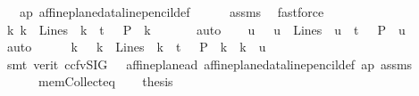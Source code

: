 \begin{isabellebody}
\ {}\ {}\ ap\ affine{\isacharunderscore}{\kern0pt}plane{\isacharunderscore}{\kern0pt}data{\isachardot}{\kern0pt}line{\isacharunderscore}{\kern0pt}pencil{\isacharunderscore}{\kern0pt}def\isanewline
\ \ \ \ \isamarkupfalse%
\ assms{\isacharparenleft}{\kern0pt}{}{\isacharparenright}{\kern0pt}\ \isamarkupfalse%
\ fastforce\isanewline
\ \ \isamarkupfalse%
\ {}{\isacharcolon}{\kern0pt}{\isachardoublequoteopen}{\isasymexists}k{\isachardot}{\kern0pt}\ k\ {\isasymin}\ Lines\ {\isasymand}\ k\ {\isasymin}\ t\ {\isasymand}\ \ P\ {\isasymlhd}\ k{\isachardoublequoteclose}\ \isamarkupfalse%
\ {}\ {}\ {}\ \isamarkupfalse%
\ auto\isanewline
\ \ \isamarkupfalse%
\ u\ \ {}{\isacharcolon}{\kern0pt}\ {\isachardoublequoteopen}u\ {\isasymin}\ Lines\ {\isasymand}\ u\ {\isasymin}\ t\ {\isasymand}\ \ P\ {\isasymlhd}\ u{\isachardoublequoteclose}\ \isamarkupfalse%
\ {}\ {}\ \isamarkupfalse%
\ auto\isanewline
\ \ \isamarkupfalse%
\ {}{\isacharcolon}{\kern0pt}\ {\isachardoublequoteopen}{\isasymforall}\ k\ {\isachardot}{\kern0pt}\ {\isacharparenleft}{\kern0pt}{\isacharparenleft}{\kern0pt}\ k\ {\isasymin}\ Lines\ {\isasymand}\ k\ {\isasymin}\ t\ {\isasymand}\ \ P\ {\isasymlhd}\ k{\isacharparenright}{\kern0pt}\ {\isasymlongrightarrow}\ k\ {\isacharequal}{\kern0pt}\ u{\isacharparenright}{\kern0pt}{\isachardoublequoteclose}\ \isanewline
\ \ \isamarkupfalse%
\ {\isacharparenleft}{\kern0pt}smt\ {\isacharparenleft}{\kern0pt}verit{\isacharcomma}{\kern0pt}\ ccfv{\isacharunderscore}{\kern0pt}SIG{\isacharparenright}{\kern0pt}\ {\isachardoublequoteopen}{}{\isachardoublequoteclose}\ {\isachardoublequoteopen}{}{\isachardoublequoteclose}\ affine{\isacharunderscore}{\kern0pt}plane{\isachardot}{\kern0pt}a{}d\ affine{\isacharunderscore}{\kern0pt}plane{\isacharunderscore}{\kern0pt}data{\isachardot}{\kern0pt}line{\isacharunderscore}{\kern0pt}pencil{\isacharunderscore}{\kern0pt}def\ ap\ assms{\isacharparenleft}{\kern0pt}{}{\isacharcomma}{\kern0pt}{}{\isacharparenright}{\kern0pt}\isanewline
\ \ \ \ \ \ mem{\isacharunderscore}{\kern0pt}Collect{\isacharunderscore}{\kern0pt}eq{\isacharparenright}{\kern0pt}\isanewline
\isanewline
\ \ \isamarkupfalse%
\ {\isacharquery}{\kern0pt}thesis\ \isamarkupfalse%

\end{isabellebody}
